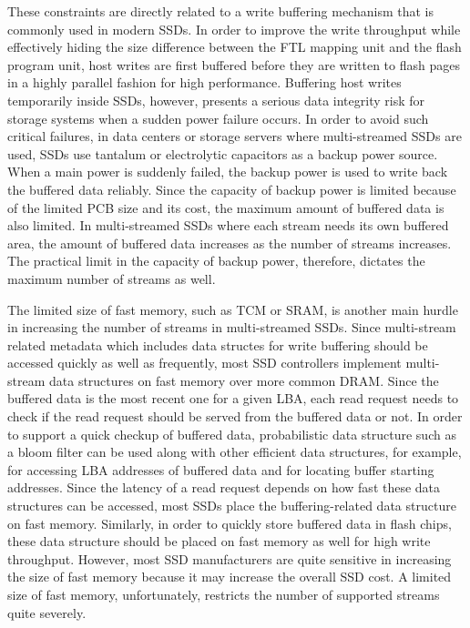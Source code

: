 {\color{blue}
These constraints are directly related to a write buffering mechanism that is 
commonly used in modern SSDs.   In order to improve the write throughput while 
effectively hiding the size difference
between the FTL mapping unit and the flash program unit, host writes are first buffered 
before they are written to flash pages in a highly parallel fashion for high performance.  
Buffering host writes temporarily inside SSDs, however, presents a serious data integrity 
risk for storage systems when a sudden power failure occurs.  
In order to avoid such critical failures, in data centers or storage servers 
where multi-streamed SSDs are used,
SSDs use tantalum or electrolytic capacitors as a backup power source.  
}
When a main power is suddenly failed, the backup power is used to write back the
buffered data reliably.  
Since the capacity of backup power is limited because of the limited PCB size and 
its cost, the maximum amount of buffered data is also limited.  
In multi-streamed SSDs where
each stream needs its own buffered area, the amount of buffered data increases 
as the number of streams increases.  
The practical limit in the capacity of backup power, therefore, dictates the maximum
number of streams as well.

The limited size of fast memory, such as TCM or SRAM, is another main hurdle in increasing 
the number of streams in multi-streamed SSDs.
Since multi-stream related metadata which includes data structes for write buffering 
should be accessed quickly as well as frequently, 
most SSD controllers implement multi-stream data structures on fast memory over more common DRAM. 
Since the buffered data is the 
{\color{blue}
most recent one for a given LBA, each read request needs to check if the read request 
should be served from the buffered data or not.
In order to support a quick checkup of buffered data, probabilistic data structure 
such as a bloom filter can be used along with other efficient data structures, 
for example,  for accessing LBA
addresses of buffered data and for locating buffer starting addresses.   
Since the latency of a read request depends on how fast these data structures 
can be accessed, most SSDs place the
buffering-related data structure on fast memory.   
Similarly, in order to quickly store buffered data in flash chips, these data structure 
should be placed on fast memory as well for high write throughput.
}
However, most SSD manufacturers are quite sensitive in increasing the size of 
fast memory because it may increase the overall SSD cost.   
A limited size of fast memory, unfortunately, restricts the number of
supported streams quite severely.

